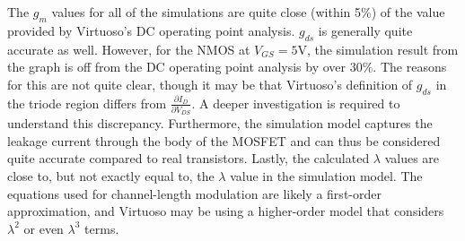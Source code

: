 The $g_{m}$ values for all of the simulations are quite close (within 5\%) of the value provided by Virtuoso's DC operating point analysis. $g_{ds}$ is generally quite accurate as well. However, for the NMOS at $V_{GS} = 5$\si{\volt}, the simulation result from the graph is off from the DC operating point analysis by over 30\%. The reasons for this are not quite clear, though it may be that Virtuoso's definition of $g_{ds}$ in the triode region differs from $\frac{\partial I_{D}}{\partial V_{DS}}$. A deeper investigation is required to understand this discrepancy. Furthermore, the simulation model captures the leakage current through the body of the MOSFET and can thus be considered quite accurate compared to real transistors. Lastly, the calculated $\lambda$ values are close to, but not exactly equal to, the $\lambda$ value in the simulation model. The equations used for channel-length modulation are likely a first-order approximation, and Virtuoso may be using a higher-order model that considers $\lambda ^2$ or even $\lambda ^3$ terms.
